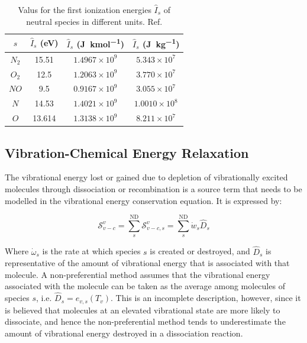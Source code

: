 \documentclass[10pt]{article}
\begin{document}
\begin{flushleft}
\begin{table}[ht]
\centering
\begin{tabular}{cccc}
\hline
$s$ & $\hat{I}_s$ (eV) & $\hat{I}_s$ (\si{\joule\per\kilo\mole}) & $\hat{I}_s$ (\si{\joule\per\kilo\gram}) \\
\hline
$N_2$ & 15.51 & $1.4967 \times 10^9$ & $5.343 \times 10^7$ \\
$O_2$ & 12.5 & $1.2063 \times 10^9$ & $3.770 \times 10^7$ \\
$NO$ & 9.5 & $0.9167 \times 10^9$ & $3.055 \times 10^7$ \\
$N$ & 14.53 & $1.4021 \times 10^9$ & $1.0010 \times 10^8$ \\
$O$ & 13.614 & $1.3138 \times 10^9$ & $8.211 \times 10^7$ \\
\hline
\end{tabular}
\caption{Valus for the first ionization energies $\hat{I}_s$ of neutral species in different units. Ref. \cite{gnoffo1989}}
\label{tab:first-ion-energy}
\end{table}


\subsection{Vibration-Chemical Energy Relaxation}
\label{sec:vib-chem-source}

The vibrational energy lost or gained due to depletion of vibrationally excited molecules through dissociation or recombination is a source term that needs to be modelled in the vibrational energy conservation equation. It is expressed by:

\begin{equation}
    \mathcal{S}_{v-c}^{v} = \sum_{s}^\text{ND} \mathcal{S}_{v-c,s}^{v} = \sum_s^\text{ND} \dot{w}_s \hat{D}_s
\end{equation}

Where $\dot{\omega}_s$ is the rate at which species $s$ is created or destroyed, and $\hat{D}_s$ is representative of the amount of vibrational energy that is associated with that molecule. A non-preferential method assumes that the vibrational energy associated with the molecule can be taken as the average among molecules of species $s$, i.e. $\hat{D}_s = e_{v,s}(T_v)$. This is an incomplete description, however, since it is believed that molecules at an elevated vibrational state are more likely to dissociate, and hence the non-preferential method tends to underestimate the amount of vibrational energy destroyed in a dissociation reaction.


\end{flushleft}
\end{document}
